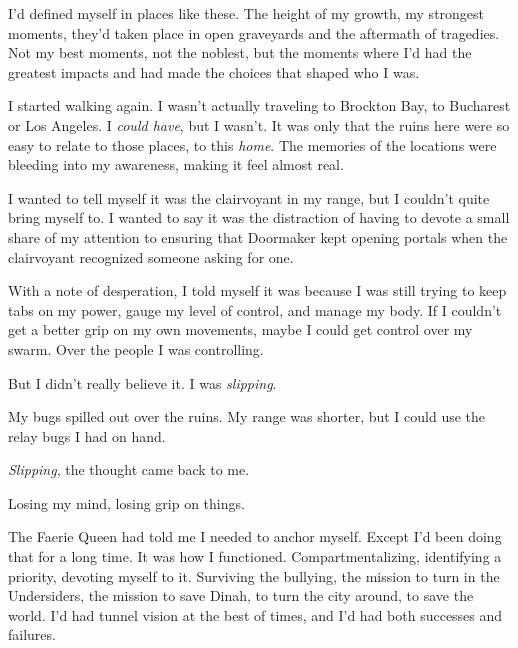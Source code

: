 I'd defined myself in places like these.  The height of my growth, my strongest moments, they'd taken place in open graveyards and the aftermath of tragedies.  Not my best moments, not the noblest, but the moments where I'd had the greatest impacts and had made the choices that shaped who I was.



I started walking again.  I wasn't actually traveling to Brockton Bay, to Bucharest or Los Angeles.  I \emph{could have}, but I wasn't.  It was only that the ruins here were so easy to relate to those places, to this \emph{home}.  The memories of the locations were bleeding into my awareness, making it feel almost real.



I wanted to tell myself it was the clairvoyant in my range, but I couldn't quite bring myself to.  I wanted to say it was the distraction of having to devote a small share of my attention to ensuring that Doormaker kept opening portals when the clairvoyant recognized someone asking for one.



With a note of desperation, I told myself it was because I was still trying to keep tabs on my power, gauge my level of control, and manage my body.  If I couldn't get a better grip on my own movements, maybe I could get control over my swarm.  Over the people I was controlling.



But I didn't really believe it.  I was \emph{slipping}.



My bugs spilled out over the ruins.  My range was shorter, but I could use the relay bugs I had on hand.



\emph{Slipping}, the thought came back to me.



Losing my mind, losing grip on things.



The Faerie Queen had told me I needed to anchor myself.  Except I'd been doing that for a long time.  It was how I functioned.  Compartmentalizing, identifying a priority, devoting myself to it.  Surviving the bullying, the mission to turn in the Undersiders, the mission to save Dinah, to turn the city around, to save the world.  I'd had tunnel vision at the best of times, and I'd had both successes and failures.



